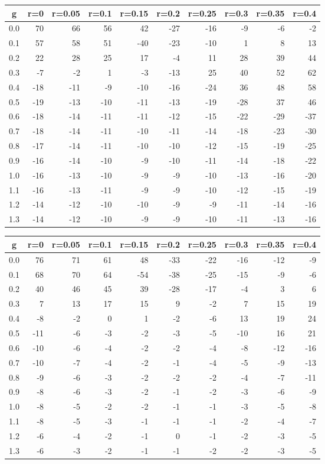 %
\begin{table}[!tbp]
 \begin{center}
 \begin{tabular}{rrrrrrrrrr}\hline\hline
\multicolumn{1}{c}{g}&\multicolumn{1}{c}{r=0}&\multicolumn{1}{c}{r=0.05}&\multicolumn{1}{c}{r=0.1}&\multicolumn{1}{c}{r=0.15}&\multicolumn{1}{c}{r=0.2}&\multicolumn{1}{c}{r=0.25}&\multicolumn{1}{c}{r=0.3}&\multicolumn{1}{c}{r=0.35}&\multicolumn{1}{c}{r=0.4}\tabularnewline
\hline
0.0& 70& 66& 56& 42&-27&-16& -9& -6& -2\tabularnewline
0.1& 57& 58& 51&-40&-23&-10&  1&  8& 13\tabularnewline
0.2& 22& 28& 25& 17& -4& 11& 28& 39& 44\tabularnewline
0.3& -7& -2&  1& -3&-13& 25& 40& 52& 62\tabularnewline
0.4&-18&-11& -9&-10&-16&-24& 36& 48& 58\tabularnewline
0.5&-19&-13&-10&-11&-13&-19&-28& 37& 46\tabularnewline
0.6&-18&-14&-11&-11&-12&-15&-22&-29&-37\tabularnewline
0.7&-18&-14&-11&-10&-11&-14&-18&-23&-30\tabularnewline
0.8&-17&-14&-11&-10&-10&-12&-15&-19&-25\tabularnewline
0.9&-16&-14&-10& -9&-10&-11&-14&-18&-22\tabularnewline
1.0&-16&-13&-10& -9& -9&-10&-13&-16&-20\tabularnewline
1.1&-16&-13&-11& -9& -9&-10&-12&-15&-19\tabularnewline
1.2&-14&-12&-10&-10& -9& -9&-11&-14&-16\tabularnewline
1.3&-14&-12&-10& -9& -9&-10&-11&-13&-16\tabularnewline
\hline
\end{tabular}

\end{center}

\end{table}

%
\begin{table}[!tbp]
 \begin{center}
 \begin{tabular}{rrrrrrrrrr}\hline\hline
\multicolumn{1}{c}{g}&\multicolumn{1}{c}{r=0}&\multicolumn{1}{c}{r=0.05}&\multicolumn{1}{c}{r=0.1}&\multicolumn{1}{c}{r=0.15}&\multicolumn{1}{c}{r=0.2}&\multicolumn{1}{c}{r=0.25}&\multicolumn{1}{c}{r=0.3}&\multicolumn{1}{c}{r=0.35}&\multicolumn{1}{c}{r=0.4}\tabularnewline
\hline
0.0& 76&71&61& 48&-33&-22&-16&-12& -9\tabularnewline
0.1& 68&70&64&-54&-38&-25&-15& -9& -6\tabularnewline
0.2& 40&46&45& 39&-28&-17& -4&  3&  6\tabularnewline
0.3&  7&13&17& 15&  9& -2&  7& 15& 19\tabularnewline
0.4& -8&-2& 0&  1& -2& -6& 13& 19& 24\tabularnewline
0.5&-11&-6&-3& -2& -3& -5&-10& 16& 21\tabularnewline
0.6&-10&-6&-4& -2& -2& -4& -8&-12&-16\tabularnewline
0.7&-10&-7&-4& -2& -1& -4& -5& -9&-13\tabularnewline
0.8& -9&-6&-3& -2& -2& -2& -4& -7&-11\tabularnewline
0.9& -8&-6&-3& -2& -1& -2& -3& -6& -9\tabularnewline
1.0& -8&-5&-2& -2& -1& -1& -3& -5& -8\tabularnewline
1.1& -8&-5&-3& -1& -1& -1& -2& -4& -7\tabularnewline
1.2& -6&-4&-2& -1&  0& -1& -2& -3& -5\tabularnewline
1.3& -6&-3&-2& -1& -1& -2& -2& -3& -5\tabularnewline
\hline
\end{tabular}

\end{center}

\end{table}

